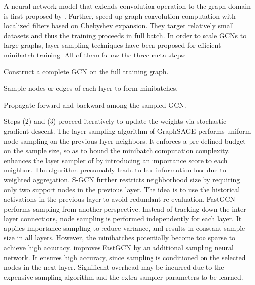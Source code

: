\documentclass{article} \usepackage{iclr2020_conference,times}
\begin{document}
A neural network model that extends convolution operation to the graph domain is first proposed by \cite{gcn_lecun}. Further, \cite{gcn, gcn_nips16} speed up graph convolution computation with localized filters based on Chebyshev expansion. They target relatively small datasets and thus the training proceeds in full batch. In order to scale GCNs to large graphs, layer sampling techniques \citep{graphsage,fastgcn,gcn_web,s-gcn,lgcn,as-gcn} have been proposed for efficient minibatch training. All of them follow the three meta steps: 
\begin{enumerate*}
\item Construct a complete GCN on the full training graph. 
\item Sample nodes or edges of each layer to form minibatches. 
\item Propagate forward and backward among the sampled GCN. 
\end{enumerate*}
Steps (2) and (3) proceed iteratively to update the weights via stochastic gradient descent. 
The layer sampling algorithm of GraphSAGE \citep{graphsage} performs uniform node sampling on the previous layer neighbors. It enforces a pre-defined budget on the sample size, so as to bound the minibatch computation complexity. 
\cite{gcn_web} enhances the layer sampler of \cite{graphsage} by introducing an importance score to each neighbor. The algorithm presumably leads to less information loss due to weighted aggregation. 
S-GCN \citep{s-gcn}  further restricts neighborhood size by requiring only two support nodes in the previous layer. The idea is to use the historical activations in the previous layer to avoid redundant re-evaluation. 
FastGCN \citep{fastgcn} performs sampling from another perspective. Instead of tracking down the inter-layer connections, node sampling is performed independently for each layer. It applies importance sampling to reduce variance, and results in constant sample size in all layers. However, the minibatches potentially become too sparse to achieve high accuracy. \cite{as-gcn} improves FastGCN by an additional sampling neural network. It ensures high accuracy, since sampling is conditioned on the selected nodes in the next layer. Significant overhead may be incurred due to the expensive sampling algorithm and the extra sampler parameters to be learned. 
\end{document}

